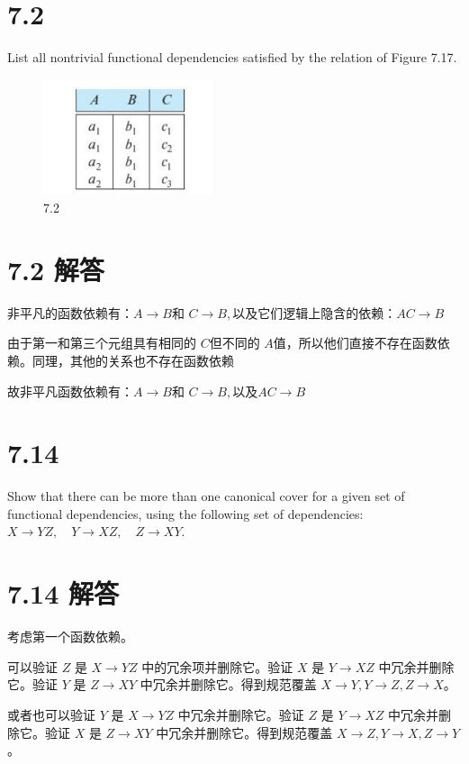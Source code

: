 \documentclass{article}
\begin{document}
	\section*{7.2}
	
	List all nontrivial functional dependencies satisfied by the relation of Figure 7.17.
	
	\begin{figure}[H]
		\centering
		\includegraphics[width=5cm]{./images/7.2.png}
		\caption{7.2}
	\end{figure}
	
	
	\section*{7.2 解答}
	
	非平凡的函数依赖有：$ A \rightarrow B $和 $ C \rightarrow B, $以及它们逻辑上隐含的依赖：$ AC \rightarrow B$
	
	由于第一和第三个元组具有相同的 $ C $但不同的 $ A $值，所以他们直接不存在函数依赖。同理，其他的关系也不存在函数依赖
	
	故非平凡函数依赖有：$ A \rightarrow B $和 $ C \rightarrow B, $以及$ AC \rightarrow B$
	
	\section*{7.14} 
	Show that there can be more than one canonical cover for a given set of functional dependencies, using the following set of dependencies:
	$
	X \rightarrow YZ, \quad Y \rightarrow XZ, \quad Z \rightarrow XY.
	$
	
	\section*{7.14 解答}
	
	考虑第一个函数依赖。
	
	可以验证 $Z$ 是 $X \to YZ$ 中的冗余项并删除它。验证 $X$ 是 $Y \to XZ$ 中冗余并删除它。验证 $Y$ 是 $Z \to XY$ 中冗余并删除它。得到规范覆盖 $X \to Y, Y \to Z, Z \to X$。
	
	或者也可以验证 $Y$ 是 $X \to YZ$ 中冗余并删除它。验证 $Z$ 是 $Y \to XZ$ 中冗余并删除它。验证 $X$ 是 $Z \to XY$ 中冗余并删除它。得到规范覆盖 $X \to Z, Y \to X, Z \to Y$。
	
\end{document}
